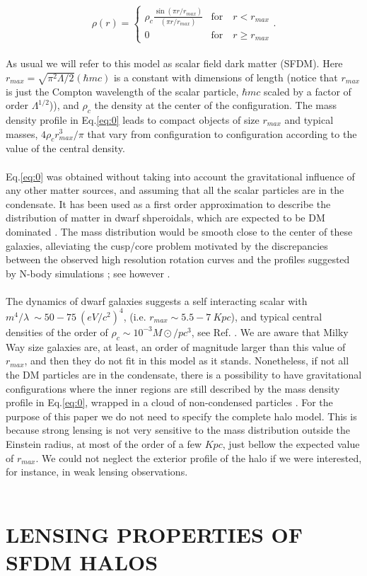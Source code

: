 \documentclass[letterpaper,10pt]{article}
\begin{document}
\begin{multicols}{2}
{\begin{equation}
\label{eq:0}
\rho (r) = \left\{
	     \begin{array}{ll}
			\rho_c \frac{\sin(\pi r/r_{max})}{(\pi r/r_{max})} & \mathrm{for} \quad r<r_{max} \\ 
			0  & \mathrm{for} \quad  r\geq r_{max}
		\end{array} .
	     \right.
\end{equation} 
\\
As usual we will refer to this model as scalar field dark matter (SFDM). Here $r_{max}= \sqrt{\pi^2 \Lambda/2} (\hbar mc)$ is a constant with dimensions of length (notice that $r_{max}$ is just the Compton wavelength of the scalar particle, $\hbar mc$ scaled by a factor of order $\Lambda^{1/2}$)), and $\rho_c$ the density at the center of the configuration. The mass density profile in Eq.\eqref{eq:0} leads to compact objects of size $r_{max}$ and typical masses, $4\rho_cr_{max}^3/\pi$ that vary from configuration to configuration according to the value of the central density.
\\\\
Eq.\eqref{eq:0} was obtained without taking into account the gravitational influence of any other matter sources, and assuming that all the scalar particles are in the condensate. It has been used as a first order approximation to describe the distribution of matter in dwarf shperoidals, which are expected to be DM dominated \cite{Arbey_2003-Robles_2012}. The mass distribution would be smooth close to the center of these galaxies, alleviating the cusp/core problem motivated by the discrepancies between the observed high resolution rotation curves and the profiles suggested by N-body simulations \cite{de_Blok_2002}; see however \cite{Valenzuela_2007}.
\\\\
The dynamics of dwarf galaxies suggests a self interacting scalar with $m^4/ \lambda \: \sim 50-75 \: (eV/c^2)^4$, (i.e. $r_{max} \sim 5.5 - 7 \: Kpc$), and typical central densities of the order of $\rho_c \sim 10^{-3}M\odot/pc^3$, see Ref. \cite{Arbey_2003}. We are aware that Milky Way size galaxies are, at least, an order of magnitude larger than this value of $r_{max}$, and then they do not fit in this model as it stands. Nonetheless, if not all the DM particles are in the condensate, there is a possibility to have gravitational configurations where the inner regions are still described by the mass density profile in Eq.\eqref{eq:0}, wrapped in a cloud of non-condensed particles \cite{Bili__2000}. For the purpose of this paper we do not need to specify the complete halo model. This is because strong lensing is not very sensitive to the mass distribution outside the Einstein radius, at most of the order of a few $Kpc$, just bellow the expected value of $r_{max}$. We could not neglect the exterior profile of the halo if we were interested, for instance, in weak lensing observations.
\\ \\
\small\section{LENSING PROPERTIES OF SFDM HALOS}

}
\end{multicols}
\end{document}

